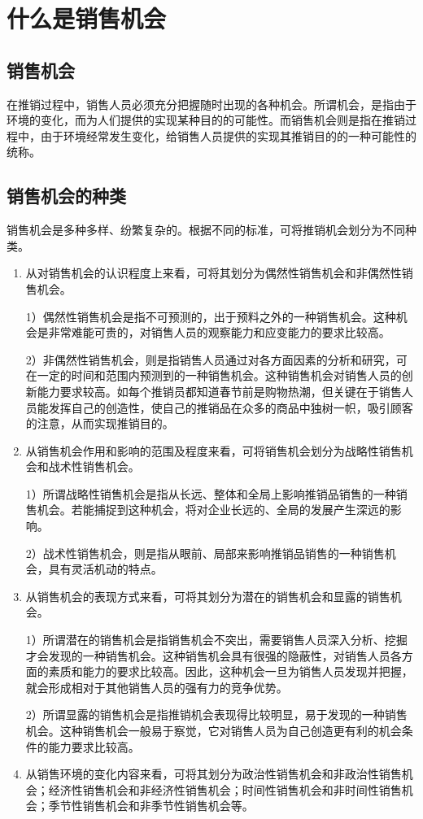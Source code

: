 \section {什么是销售机会}

\subsection {销售机会}

    在推销过程中，销售人员必须充分把握随时出现的各种机会。所谓机会，是指由于环境的变化，而为人们提供的实现某种目的的可能性。而销售机会则是指在推销过程中，由于环境经常发生变化，给销售人员提供的实现其推销目的的一种可能性的统称。

\subsection {销售机会的种类}
    销售机会是多种多样、纷繁复杂的。根据不同的标准，可将推销机会划分为不同种类。

    \begin{enumerate}
        \item 从对销售机会的认识程度上来看，可将其划分为偶然性销售机会和非偶然性销售机会。

            1）偶然性销售机会是指不可预测的，出于预料之外的一种销售机会。这种机会是非常难能可贵的，对销售人员的观察能力和应变能力的要求比较高。

            2）非偶然性销售机会，则是指销售人员通过对各方面因素的分析和研究，可在一定的时间和范围内预测到的一种销售机会。这种销售机会对销售人员的创新能力要求较高。如每个推销员都知道春节前是购物热潮，但关键在于销售人员能发挥自己的创造性，使自己的推销品在众多的商品中独树一帜，吸引顾客的注意，从而实现推销目的。

        \item 从销售机会作用和影响的范围及程度来看，可将销售机会划分为战略性销售机会和战术性销售机会。

            1）所谓战略性销售机会是指从长远、整体和全局上影响推销品销售的一种销售机会。若能捕捉到这种机会，将对企业长远的、全局的发展产生深远的影响。

            2）战术性销售机会，则是指从眼前、局部来影响推销品销售的一种销售机会，具有灵活机动的特点。

        \item 从销售机会的表现方式来看，可将其划分为潜在的销售机会和显露的销售机会。

            1）所谓潜在的销售机会是指销售机会不突出，需要销售人员深入分析、挖掘才会发现的一种销售机会。这种销售机会具有很强的隐蔽性，对销售人员各方面的素质和能力的要求比较高。因此，这种机会一旦为销售人员发现并把握，就会形成相对于其他销售人员的强有力的竞争优势。

            2）所谓显露的销售机会是指推销机会表现得比较明显，易于发现的一种销售机会。这种销售机会一般易于察觉，它对销售人员为自己创造更有利的机会条件的能力要求比较高。

        \item 从销售环境的变化内容来看，可将其划分为政治性销售机会和非政治性销售机会；经济性销售机会和非经济性销售机会；时间性销售机会和非时间性销售机会；季节性销售机会和非季节性销售机会等。

        \end{enumerate}

